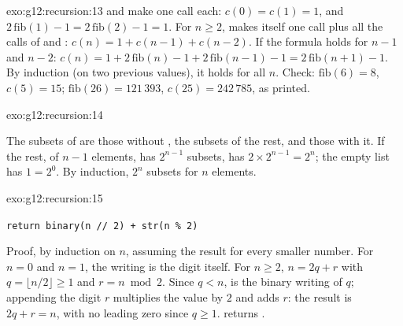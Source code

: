 \begin{solution}{exo:g12:recursion:13}
 and  make one call each: $c(0) = c(1) = 1$, and $2\,\mathrm{fib}(1) - 1 = 2\,\mathrm{fib}(2)
- 1 = 1$. For $n \ge 2$,  makes itself one call plus all the calls of  and
: $c(n) = 1 + c(n - 1) + c(n - 2)$. If the formula holds for $n - 1$ and $n - 2$:
$c(n) = 1 + 2\,\mathrm{fib}(n) - 1 + 2\,\mathrm{fib}(n - 1) - 1 = 2\,\mathrm{fib}(n + 1) - 1$. By induction (on two
previous values), it holds for all $n$. Check: $\mathrm{fib}(6) = 8$, $c(5) = 15$; $\mathrm{fib}(26) = 121\,393$,
$c(25) = 242\,785$, as printed.
\end{solution}

\begin{solution}{exo:g12:recursion:14}
\smallskip\noindent\hspace*{2em}

\noindent\hspace*{4em}

\noindent\hspace*{6em}

\noindent\hspace*{4em}

\noindent\hspace*{4em}

\smallskip\noindent The subsets of  are those without , the subsets of the rest, and those with
it. If the rest, of $n - 1$ elements, has $2^{n-1}$ subsets,  has $2 \times 2^{n-1} = 2^n$; the empty list has
$1 = 2^0$. By induction, $2^n$ subsets for $n$ elements.
\end{solution}

\begin{solution}{exo:g12:recursion:15}
\smallskip\noindent\hspace*{2em}

\noindent\hspace*{4em}

\noindent\hspace*{6em}

\noindent\hspace*{4em}\texttt{return binary(n // 2) + str(n \% 2)}

\smallskip\noindent Proof, by induction on $n$, assuming the result for every smaller number. For $n = 0$ and $n = 1$,
the writing is the digit itself. For $n \ge 2$, $n = 2q + r$ with $q = \lfloor n/2 \rfloor \ge 1$ and $r = n \bmod 2$. Since
$q < n$,  is the binary writing of $q$; appending the digit $r$ multiplies the value by $2$ and adds
$r$: the result is $2q + r = n$, with no leading zero since $q \ge 1$.  returns .
\end{solution}

